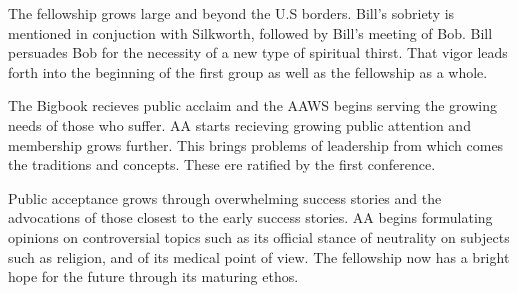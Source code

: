 
\bbChapterPreamble

    The fellowship grows large and beyond the U.S borders.
Bill's sobriety is mentioned in conjuction with Silkworth, 
    followed by Bill's meeting of Bob.
Bill persuades Bob for the necessity of a new type of spiritual thirst.
That vigor leads forth into the beginning of the first group 
    as well as the fellowship as a whole. 

    The Bigbook recieves public acclaim 
    and the AAWS begins serving the growing needs of those who suffer.
AA starts recieving growing public attention 
    and membership grows further.
This brings problems of leadership 
    from which comes the traditions and concepts.
These ere ratified by the first conference.

    Public acceptance grows 
    through overwhelming success stories 
    and the advocations of those closest 
    to the early success stories.
AA begins formulating opinions on controversial topics 
    such as its official stance of neutrality on subjects such as 
    religion, and of its medical point of view.
The fellowship now has a bright hope for the future 
    through its maturing ethos.


